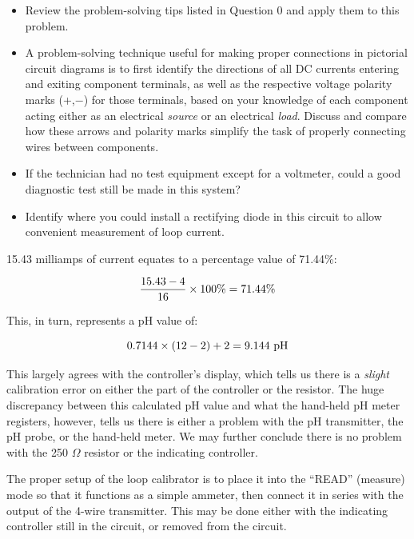 \begin{itemize}
\item{} Review the problem-solving tips listed in Question 0 and apply them to this problem.
\item{} A problem-solving technique useful for making proper connections in pictorial circuit diagrams is to first identify the directions of all DC currents entering and exiting component terminals, as well as the respective voltage polarity marks (+,$-$) for those terminals, based on your knowledge of each component acting either as an electrical {\it source} or an electrical {\it load}.  Discuss and compare how these arrows and polarity marks simplify the task of properly connecting wires between components. 
\item{} If the technician had no test equipment except for a voltmeter, could a good diagnostic test still be made in this system?
\item{} Identify where you could install a rectifying diode in this circuit to allow convenient measurement of loop current.
\end{itemize}







15.43 milliamps of current equates to a percentage value of 71.44\%:

$${15.43 - 4 \over 16} \times 100\% = 71.44\%$$

This, in turn, represents a pH value of:

$$0.7144 \times (12 - 2) + 2 = 9.144 \hbox{ pH}$$

\vskip 10pt

This largely agrees with the controller's display, which tells us there is a {\it slight} calibration error on either the part of the controller or the resistor.  The huge discrepancy between this calculated pH value and what the hand-held pH meter registers, however, tells us there is either a problem with the pH transmitter, the pH probe, or the hand-held meter.  We may further conclude there is no problem with the 250 $\Omega$ resistor or the indicating controller.
 
\vskip 10pt

The proper setup of the loop calibrator is to place it into the ``READ'' (measure) mode so that it functions as a simple ammeter, then connect it in series with the output of the 4-wire transmitter.  This may be done either with the indicating controller still in the circuit, or removed from the circuit.

